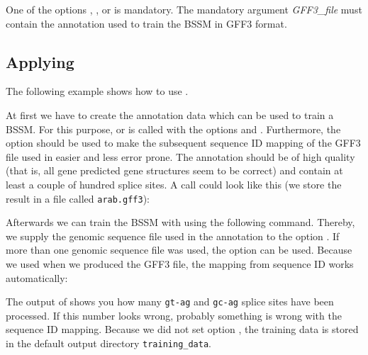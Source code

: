 \documentclass[11pt,a4paper,titlepage]{article}
\begin{document}
One of the options , , or
 is mandatory.
The mandatory argument \textit{GFF3\_file} must contain the annotation used to
train the BSSM in GFF3 format.

\subsection{Applying \Callgthbssmtrain}

The following example shows how to use \Callgthbssmtrain.

At first we have to create the annotation data which can be used to train a
BSSM. For this purpose, \Callgth or \Callgthconsensus is called with the options
 and . Furthermore, the option
 should be used to make the subsequent sequence ID mapping of
the GFF3 file used in \Callgthbssmtrain easier and less error prone.
The annotation should be of high quality (that is, all gene predicted gene
structures seem to be correct) and contain at least a couple of hundred splice
sites. A \Callgth call could look like this (we store the result in a file
called \texttt{arab.gff3}):

\begin{scriptsize}\end{scriptsize}

Afterwards we can train the BSSM with \Callgthbssmtrain using the following
command. Thereby, we supply the genomic sequence file used in the annotation to
the option . If more than one genomic sequence file was
used, the option  can be used. Because we used
 when we produced the GFF3 file, the mapping from sequence ID
works automatically:

\begin{footnotesize}\end{footnotesize}

The output of \Callgthbssmtrain shows you how many \texttt{gt-ag} and
\texttt{gc-ag} splice sites have been processed. If this number looks wrong,
probably something is wrong with the sequence ID mapping. Because we did not set
option , the training data is stored in the default output
directory \texttt{training\_data}.
\end{document}

